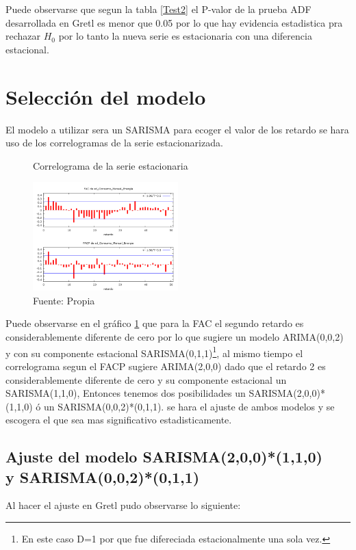 \documentclass[12pt,letterpaper]{report}
\begin{document}
Puede observarse que segun la tabla \ref{Test2} el P-valor de la prueba ADF desarrollada en Gretl es menor que 0.05 por lo que hay evidencia estadistica pra rechazar $H_0$ por lo tanto la nueva serie es estacionaria con una diferencia estacional.

\section{Selección del modelo}

El modelo a utilizar sera un SARISMA para ecoger el valor de los retardo se hara uso de los correlogramas de la serie estacionarizada.

\begin{figure}[htb]

\centering
\caption{Correlograma de la serie estacionaria} 
\includegraphics [width=0.5\textwidth]{CEST}
\caption*{Fuente: Propia} \label{Graf5}

\end{figure}

Puede observarse en el gráfico \ref{Graf5} que para la FAC el segundo retardo es considerablemente diferente de cero por lo que sugiere un modelo ARIMA(0,0,2) y con su componente estacional SARISMA(0,1,1)\footnote{En este caso D=1 por que fue difereciada estacionalmente una sola vez.}, al mismo tiempo el correlograma segun el FACP sugiere ARIMA(2,0,0) dado que el retardo 2 es considerablemente diferente de cero y su componente estacional un SARISMA(1,1,0), Entonces tenemos dos posibilidades un SARISMA(2,0,0)*(1,1,0) ó un SARISMA(0,0,2)*(0,1,1). se hara el ajuste de ambos modelos y se escogera el que sea mas significativo estadisticamente.

\subsection{Ajuste del modelo SARISMA(2,0,0)*(1,1,0)\\ y SARISMA(0,0,2)*(0,1,1)}

Al hacer el ajuste en Gretl pudo observarse lo siguiente:
\end{document}
